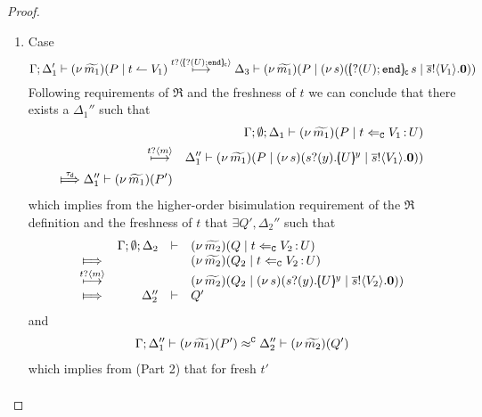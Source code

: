 \begin{proof}
\begin{enumerate}[1.]
\begin{enumerate}
					\item	%
						Case
						\[
							\horel{\Gamma}{\Delta_1'}{\newsp{\widetilde{m_1}}{P \Par \ntrigger{t}{V_1}}}
							{\hby{\bactinp{t}{\omapchar{\btinp{U} \tinact}}}}
							{\Delta_3}{\newsp{\widetilde{m_1}}{P \Par \newsp{s}{ \appl{\omapchar{\btinp{U} \tinact}}{s} \Par \bout{\dual{s}}{V_1} \inact}}}
						\]
							Following requirements of $\Re$ and the freshness of $t$
							we can conclude that there exists a $\Delta_1''$ such that
						\begin{eqnarray*}
							&& \Gamma; \es; \Delta_1 \proves \newsp{\widetilde{m_1}}{P \Par \ftrigger{t}{V_1}{U}}\\
							\hby{\bactinp{t}{m}} &&
							\Delta_1'' \proves \newsp{\widetilde{m_1}}{P \Par \newsp{s}{\binp{s}{y} \mapchar{U}{y} \Par \bout{\dual{s}}{V_1} \inact}}\\
							\Hby{\dtau}
							\Delta_1'' \proves \newsp{\widetilde{m_1}}{P'}
						\end{eqnarray*}
							which implies from the higher-order bisimulation requirement of the $\Re$ definition and
							the freshness of $t$ that $\exists Q', \Delta_2''$ such that
							\begin{eqnarray}
								\begin{array}{crll}
									& \Gamma; \es; \Delta_2 & \proves &		
									\newsp{\widetilde{m_2}}{Q \Par \ftrigger{t}{V_2}{U}}
									\\
									\Hby{} &&&
									\newsp{\widetilde{m_2}}{Q_2 \Par \ftrigger{t}{V_2}{U}}
									\\
									{\hby{\bactinp{t}{m}}}& & &
									\newsp{\widetilde{m_2}}{Q_2 \Par \newsp{s}{\binp{s}{y} \mapchar{U}{y} \Par \bout{\dual{s}}{V_2} \inact}}
									\\
									\Hby{} & \Delta_2'' & \proves & Q'
								\end{array}
								\label{proof:trig_equiv2}
							\end{eqnarray}
							and
							\begin{eqnarray*}
								\Gamma; \Delta_1'' \vdash (\nu\, \widetilde{m_1})(P') \approx^\mathtt{C} \Delta_2'' \vdash (\nu\, \widetilde{m_2})(Q')
							\end{eqnarray*}
							which implies from  (Part 2) that
							for fresh $t'$
							\begin{eqnarray*}

\end{eqnarray*}
\end{enumerate}
\end{enumerate}
\end{proof}
